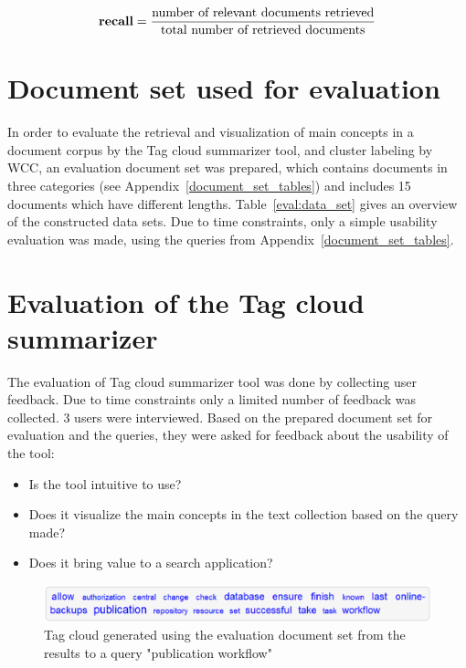 \begin{equation}
\mbox{\textbf{recall}} = \frac{\mbox{number of relevant documents retrieved}} {\mbox{total number of retrieved documents}}
\end{equation}

\section{Document set used for evaluation}
In order to evaluate the retrieval and visualization of main concepts in a document corpus by the Tag cloud summarizer tool, and cluster labeling by \gls{WCC}, an evaluation document set was prepared, which contains documents in three categories (see Appendix~\ref{document_set_tables}) and includes 15 documents which have different lengths. Table~\ref{eval:data_set} gives an overview of the constructed data sets. Due to time constraints, only a simple usability evaluation was made, using the queries from Appendix~\ref{document_set_tables}.


\section{Evaluation of the Tag cloud summarizer}
The evaluation of Tag cloud summarizer tool was done by collecting user feedback. Due to time constraints only a limited number of feedback was collected. 3 users were interviewed. Based on the prepared document set for evaluation and the queries, they were asked for feedback about the usability of the tool: \\
\begin{itemize}
\item Is the tool intuitive to use?
\item Does it visualize the main concepts in the text collection based on the query made?
\item Does it bring value to a search application?

\end{itemize}

\begin{figure}[H]
	\centering
	\includegraphics[scale=0.5]{img/publication_workflow} 
	\caption[Tag cloud generated]{Tag cloud generated using the evaluation document set from the results to a query "publication workflow"}
\label{publication_workflow}
\end{figure}

